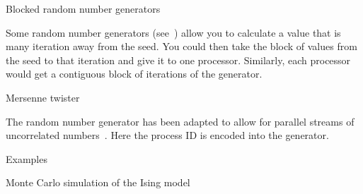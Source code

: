  {Blocked random number generators}

Some random number generators (see~\cite{LEcuyer:multiple-random})
allow you to calculate a value that is many iteration away from the seed.
You could then take the block of values from the seed to that iteration
and give it to one processor. Similarly, each processor would get a contiguous
block of iterations of the generator.

 {Mersenne twister}

The  random number generator has been
adapted to allow for parallel streams of uncorrelated
numbers~\cite{Matsumoto:DynamicMersenne}. Here the process ID is
encoded into the generator.


 {Examples}

 {Monte Carlo simulation of the Ising model}
\label{sec:ising}


